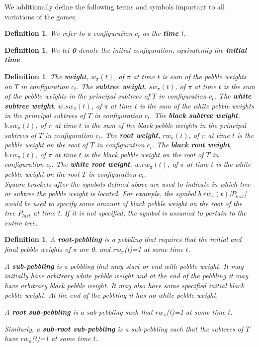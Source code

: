\documentclass[12pt]{article}
\newtheorem{definition}[theorem]{Definition}
\begin{document}
We additionally define the following terms and symbols important to all variations of the games.

\begin{definition}
We refer to a configuration $c_t$ as the {\bf time} t.
\end{definition}

\begin{definition}
We let {\bf 0} denote the initial configuration, equivalently the {\bf initial time}.
\end{definition}

\begin{definition}
The {\bf weight}, $w_\pi(t)$, of $\pi$ at time $t$ is sum of the
pebble weights on $T$ in configuration $c_t$. The {\bf subtree weight}, $sw_\pi(t)$, of $\pi$ at time $t$ is the sum of the pebble weights in the principal subtrees of $T$ in configuration $c_t$. 
The {\bf white subtree weight}, $w.sw_\pi(t)$, of $\pi$ at time $t$ is the sum of the white pebble weights in the principal subtrees of $T$ in configuration $c_t$. The {\bf black subtree weight}, $b.sw_\pi(t)$, of $\pi$ at time $t$ is the sum of the black pebble weights in the principal subtrees of $T$ in configuration $c_t$. The {\bf root weight}, $rw_\pi(t)$, of $\pi$ at time $t$ is the pebble weight on the root of $T$ in configuration $c_t$. The {\bf black root weight}, $b.rw_\pi(t)$, of $\pi$ at time $t$ is the black pebble weight on the root of $T$ in configuration $c_t$. The {\bf white root weight}, $w.rw_\pi(t)$, of $\pi$ at time $t$ is the white pebble weight on the root $T$ in configuration $c_t$.\\

\noindent
Square brackets after the symbols defined above are used to indicate in which tree or subtree the pebble weight is located. For example, the symbol $b.rw_\pi(t)$[$P_{last}$] would be used to specify some amount of black pebble weight on the root of the tree $P_{last}$ at time t. If it is not specified, the symbol is assumed to pertain to the entire tree.
\end{definition}

\begin{definition}
\noindent
A {\bf root-pebbling} is a pebbling that requires that the initial and final pebble weights of $\pi$ are 0, and 
$rw_\pi$(t)=1 at some time $t$. 

\noindent
A {\bf sub-pebbling} is a pebbling that may start or end with pebble weight. It may initially have arbitrary white pebble weight and at the end of the pebbling it may have arbitrary black pebble weight. It may also have some specified initial black pebble weight. At the end of the pebbling it has no white pebble weight.

\noindent
A {\bf root sub-pebbling} is a sub-pebbling such that $rw_\pi$(t)=1 at some time $t$. 

\noindent
Similarly, a {\bf sub-root sub-pebbling} is a sub-pebbling such that the subtrees of $T$ have $rw_\pi$(t)=1 at some time $t$.
\end{definition}
\end{document}
